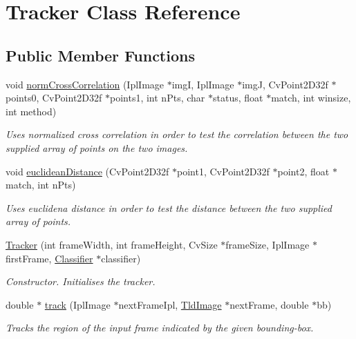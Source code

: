 \hypertarget{class_tracker}{\section{\-Tracker \-Class \-Reference}
\label{class_tracker}
}
\subsection*{\-Public \-Member \-Functions}
\begin{DoxyCompactItemize}
\item 
void \hyperlink{class_tracker_a030890322db8ac9961ff727dfa123b80}{norm\-Cross\-Correlation} (\-Ipl\-Image $\ast$img\-I, \-Ipl\-Image $\ast$img\-J, \-Cv\-Point2\-D32f $\ast$points0, \-Cv\-Point2\-D32f $\ast$points1, int n\-Pts, char $\ast$status, float $\ast$match, int winsize, int method)
\begin{DoxyCompactList}\small\item\em \-Uses normalized cross correlation in order to test the correlation between the two supplied array of points on the two images. \end{DoxyCompactList}\item 
void \hyperlink{class_tracker_a9fdbbdb33878ec07c2975608d3febe67}{euclidean\-Distance} (\-Cv\-Point2\-D32f $\ast$point1, \-Cv\-Point2\-D32f $\ast$point2, float $\ast$match, int n\-Pts)
\begin{DoxyCompactList}\small\item\em \-Uses euclidena distance in order to test the distance between the two supplied array of points. \end{DoxyCompactList}\item 
\hyperlink{class_tracker_a911919cd3f2f301e69dcdb1be165e8e8}{\-Tracker} (int frame\-Width, int frame\-Height, \-Cv\-Size $\ast$frame\-Size, \-Ipl\-Image $\ast$first\-Frame, \hyperlink{class_classifier}{\-Classifier} $\ast$classifier)
\begin{DoxyCompactList}\small\item\em \-Constructor. \-Initialises the tracker. \end{DoxyCompactList}\item 
double $\ast$ \hyperlink{class_tracker_a930cc0528d9d0e53f6ba3d377e9875ad}{track} (\-Ipl\-Image $\ast$next\-Frame\-Ipl, \hyperlink{class_tld_image}{\-Tld\-Image} $\ast$next\-Frame, double $\ast$bb)
\begin{DoxyCompactList}\small\item\em \-Tracks the region of the input frame indicated by the given bounding-\/box. \end{DoxyCompactList}\item 

\end{DoxyCompactItemize}
